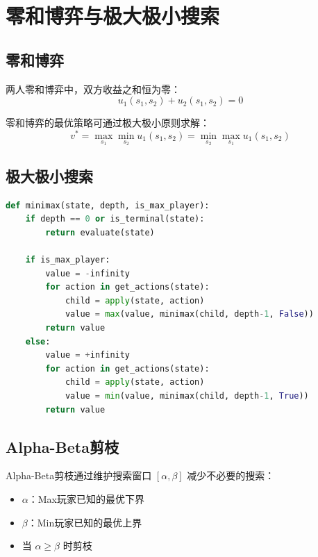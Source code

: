 \section{零和博弈与极大极小搜索}

\subsection{零和博弈}

\begin{definition}[零和博弈]
两人零和博弈中，双方收益之和恒为零：
\[ u_1(s_1, s_2) + u_2(s_1, s_2) = 0 \]
\end{definition}

零和博弈的最优策略可通过极大极小原则求解：
\[ v^* = \max_{s_1} \min_{s_2} u_1(s_1, s_2) = \min_{s_2} \max_{s_1} u_1(s_1, s_2) \]

\subsection{极大极小搜索}

\begin{algbox}[极大极小算法]
\begin{lstlisting}[language=Python,basicstyle=\ttfamily\small]
def minimax(state, depth, is_max_player):
    if depth == 0 or is_terminal(state):
        return evaluate(state)

    if is_max_player:
        value = -infinity
        for action in get_actions(state):
            child = apply(state, action)
            value = max(value, minimax(child, depth-1, False))
        return value
    else:
        value = +infinity
        for action in get_actions(state):
            child = apply(state, action)
            value = min(value, minimax(child, depth-1, True))
        return value
\end{lstlisting}
\end{algbox}

\subsection{Alpha-Beta剪枝}

Alpha-Beta剪枝通过维护搜索窗口 $[\alpha, \beta]$ 减少不必要的搜索：
\begin{itemize}[leftmargin=2em]
  \item $\alpha$：Max玩家已知的最优下界
  \item $\beta$：Min玩家已知的最优上界
  \item 当 $\alpha \geq \beta$ 时剪枝
\end{itemize}

